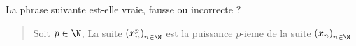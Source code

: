 La phrase suivante est-elle vraie, fausse ou incorrecte ?
\begin{quote}
 Soit $p\in \N$, La suite $\left(x_n ^p \right)_{n\in\N}$ est la puissance $p$-ieme de la suite $\left(x_n \right)_{n\in\N}$
\end{quote}
